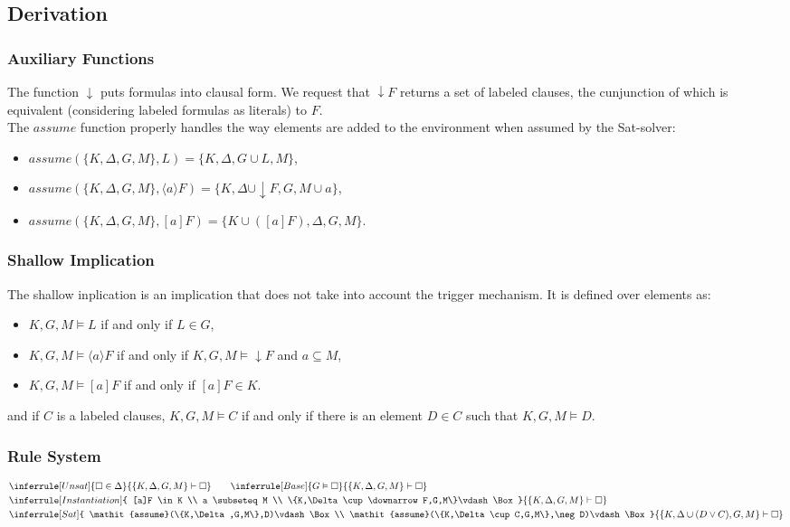 \documentclass[a4paper,11pt]{article}
\newcommand{\A}{\mathit{assume}}
\begin{document}
\subsection{Derivation}

\subsubsection{Auxiliary Functions}
The function $\downarrow$ puts formulas into clausal form. We request that $\downarrow F$
returns a set of labeled clauses, the cunjunction of which is equivalent (considering
labeled formulas as literals) to $F$.\\
The $\A$ function properly handles the way elements are added to the environment when assumed
by the Sat-solver:
\begin{itemize}
 \item $\A(\{K,\Delta,G,M\},L)=\{K,\Delta,G\cup L,M\}$,
 \item $\A(\{K,\Delta,G,M\},\langle a\rangle F)=\{K,\Delta\cup\downarrow F,G,M\cup a\}$,
 \item $\A(\{K,\Delta,G,M\},[a]F)=\{K\cup([a]F),\Delta,G,M\}$.
\end{itemize}
\subsubsection{Shallow Implication}
The shallow inplication is an implication that does not take into account the trigger
mechanism. It is defined over elements as:
\begin{itemize}
 \item $K,G,M\vDash L$ if and only if $L\in G$,
 \item $K,G,M\vDash\langle a\rangle F$ if and only if $K,G,M\vDash\downarrow F$
and $a\subseteq M$,
 \item $K,G,M\vDash[a]F$ if and only if $[a]F\in K$.
\end{itemize}
and if $C$ is a labeled clauses, $K,G,M\vDash C$ if and only if there is an element $D\in C$
such that $K,G,M\vDash D$.
\subsubsection{Rule System}
\begin{eqnarray*}
&
\inferrule [Unsat]{
\Box\in \Delta
}{
\{K,\Delta,G,M\}\vdash\Box
}\qquad
\inferrule [Base]{
G\vDash\Box
}{
\{K,\Delta,G,M\}\vdash\Box
}\\
&
\inferrule [Instantiation]{
[a]F \in K  \\ a \subseteq M \\ \{K,\Delta\cup\downarrow F,G,M\}\vdash\Box
}{
\{K,\Delta,G,M\}\vdash\Box
}\\
&
\inferrule [Sat]{
\A(\{K,\Delta,G,M\},D)\vdash\Box\\ \A(\{K,\Delta\cup C,G,M\},\neg D)\vdash\Box
}{
\{K,\Delta\cup(D\vee C),G,M\}\vdash\Box
}
\end{eqnarray*}
\end{document}
